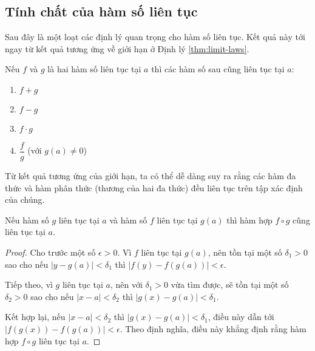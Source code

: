 \subsection{Tính chất của hàm số liên tục}
\label{subsec:properties_of_continuous_functions}

Sau đây là một loạt các định lý quan trọng cho hàm số liên tục. Kết quả này tới ngay từ kết quả tương ứng về giới hạn ở Định lý \ref{thm:limit-laws}.

\begin{theorem}
	\label{thm:properties_of_continuous_functions}
	Nếu \( f \) và \( g \) là hai hàm số liên tục tại \( a \) thì các hàm số sau cũng liên tục tại \( a \):
	\begin{enumerate}[label=(\alph*)]
		\item \( f+g \)
		\item \( f-g \)
		\item \( f \cdot g \)
		\item \( \dfrac{f}{g} \) (với \( g(a) \ne 0 \))
	\end{enumerate}
\end{theorem}

Từ kết quả tương ứng của giới hạn, ta có thể dễ dàng suy ra rằng các hàm đa thức và hàm phân thức (thương của hai đa thức) đều liên tục trên tập xác định của chúng.

\begin{theorem}
	\label{thm:composition_of_continuous_functions}
	Nếu hàm số \( g \) liên tục tại \( a \) và hàm số \( f \) liên tục tại \( g(a) \) thì hàm hợp \( f \circ g \) cũng liên tục tại \( a \).
\end{theorem}

\begin{proof}
	Cho trước một số \( \epsilon > 0 \). Vì \( f \) liên tục tại \( g(a) \), nên tồn tại một số \( \delta_1 > 0 \) sao cho nếu \( |y - g(a)| < \delta_1 \) thì \( |f(y) - f(g(a))| < \epsilon \).
	
	Tiếp theo, vì \( g \) liên tục tại \( a \), nên với \( \delta_1 > 0 \) vừa tìm được, sẽ tồn tại một số \( \delta_2 > 0 \) sao cho nếu \( |x - a| < \delta_2 \) thì \( |g(x) - g(a)| < \delta_1 \).
	
	Kết hợp lại, nếu \( |x-a| < \delta_2 \) thì \( |g(x) - g(a)| < \delta_1 \), điều này dẫn tới \( |f(g(x)) - f(g(a))| < \epsilon \). Theo định nghĩa, điều này khẳng định rằng hàm hợp \( f \circ g \) liên tục tại \( a \).
\end{proof}

